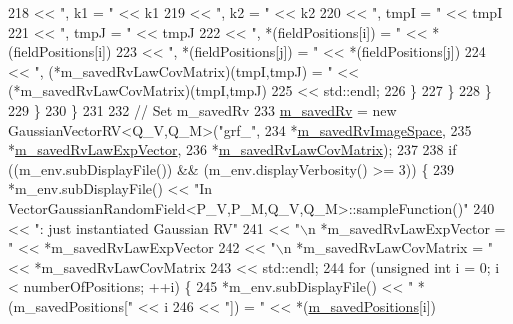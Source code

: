 \begin{DoxyCode}
218                                       << \textcolor{stringliteral}{", k1 = "} << k1
219                                       << \textcolor{stringliteral}{", k2 = "} << k2
220                                       << \textcolor{stringliteral}{", tmpI = "} << tmpI
221                                       << \textcolor{stringliteral}{", tmpJ = "} << tmpJ
222                                       << \textcolor{stringliteral}{", *(fieldPositions[i]) = "} << *(fieldPositions[i])
223                                       << \textcolor{stringliteral}{", *(fieldPositions[j]) = "} << *(fieldPositions[j])
224                                       << \textcolor{stringliteral}{", (*m\_savedRvLawCovMatrix)(tmpI,tmpJ) = "} << 
      (*m\_savedRvLawCovMatrix)(tmpI,tmpJ)
225                                       << std::endl;
226             \}
227           \}
228         \}
229       \}
230     \}
231 
232     \textcolor{comment}{// Set m\_savedRv}
233     \hyperlink{class_q_u_e_s_o_1_1_vector_gaussian_random_field_a7e2ed5d146f65c8c4ddbd1d4e496647d}{m\_savedRv} = \textcolor{keyword}{new} GaussianVectorRV<Q\_V,Q\_M>(\textcolor{stringliteral}{"grf\_"},
234                                                      *\hyperlink{class_q_u_e_s_o_1_1_vector_gaussian_random_field_a8fba910fff533442361ad7bd93e5706b}{m\_savedRvImageSpace},
235                                                      *\hyperlink{class_q_u_e_s_o_1_1_vector_gaussian_random_field_a544ce2c5ff0329b6fb7c625e71eb3576}{m\_savedRvLawExpVector},
236                                                      *\hyperlink{class_q_u_e_s_o_1_1_vector_gaussian_random_field_a0a07c1eec3d56ef764b13586a36921d3}{m\_savedRvLawCovMatrix});
237 
238     \textcolor{keywordflow}{if} ((m\_env.subDisplayFile()) && (m\_env.displayVerbosity() >= 3)) \{
239       *m\_env.subDisplayFile() << \textcolor{stringliteral}{"In VectorGaussianRandomField<P\_V,P\_M,Q\_V,Q\_M>::sampleFunction()"}
240                               << \textcolor{stringliteral}{": just instantiated Gaussian RV"}
241                               << \textcolor{stringliteral}{"\(\backslash\)n *m\_savedRvLawExpVector = "} << *m\_savedRvLawExpVector
242                               << \textcolor{stringliteral}{"\(\backslash\)n *m\_savedRvLawCovMatrix = "} << *m\_savedRvLawCovMatrix
243                               << std::endl;
244       \textcolor{keywordflow}{for} (\textcolor{keywordtype}{unsigned} \textcolor{keywordtype}{int} i = 0; i < numberOfPositions; ++i) \{
245         *m\_env.subDisplayFile() << \textcolor{stringliteral}{" *(m\_savedPositions["} << i
246                                 << \textcolor{stringliteral}{"]) = "}                << *(\hyperlink{class_q_u_e_s_o_1_1_vector_gaussian_random_field_aa51f310fb54dd4807522a0e72be61acd}{m\_savedPositions}[i])

\end{DoxyCode}
